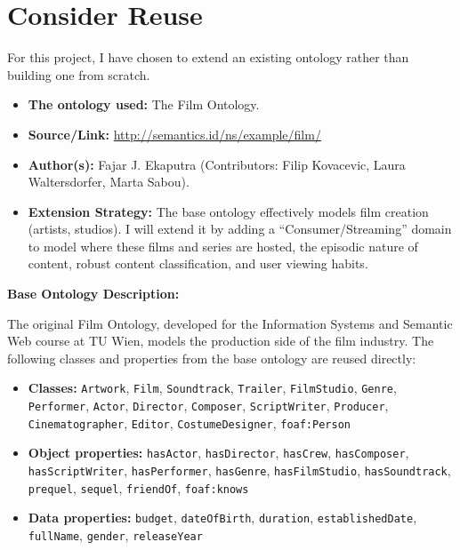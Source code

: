 \chapter{Consider Reuse}
For this project, I have chosen to extend an existing ontology rather than building one from scratch.

\begin{itemize}
    \item \textbf{The ontology used:} The Film Ontology.
    \item \textbf{Source/Link:} \url{http://semantics.id/ns/example/film/}
    \item \textbf{Author(s):} Fajar J. Ekaputra (Contributors: Filip Kovacevic, Laura Waltersdorfer, Marta Sabou).
    \item \textbf{Extension Strategy:} The base ontology effectively models film creation (artists, studios). I will extend it by adding a ``Consumer/Streaming'' domain to model where these films and series are hosted, the episodic nature of content, robust content classification, and user viewing habits.
\end{itemize}

\vspace{0.5cm}
\noindent\textbf{Base Ontology Description:}

The original Film Ontology, developed for the Information Systems and Semantic Web course at TU Wien, models the production side of the film industry. The following classes and properties from the base ontology are reused directly:

\begin{itemize}
    \item \textbf{Classes:} \texttt{Artwork}, \texttt{Film}, \texttt{Soundtrack}, \texttt{Trailer}, \texttt{FilmStudio}, \texttt{Genre}, \texttt{Performer}, \texttt{Actor}, \texttt{Director}, \texttt{Composer}, \texttt{ScriptWriter}, \texttt{Producer}, \texttt{Cinematographer}, \texttt{Editor}, \texttt{CostumeDesigner}, \texttt{foaf:Person}
    \item \textbf{Object properties:} \texttt{hasActor}, \texttt{hasDirector}, \texttt{hasCrew}, \texttt{hasComposer}, \texttt{hasScriptWriter}, \texttt{hasPerformer}, \texttt{hasGenre}, \texttt{hasFilmStudio}, \texttt{hasSoundtrack}, \texttt{prequel}, \texttt{sequel}, \texttt{friendOf}, \texttt{foaf:knows}
    \item \textbf{Data properties:} \texttt{budget}, \texttt{dateOfBirth}, \texttt{duration}, \texttt{establishedDate}, \texttt{fullName}, \texttt{gender}, \texttt{releaseYear}
\end{itemize}
